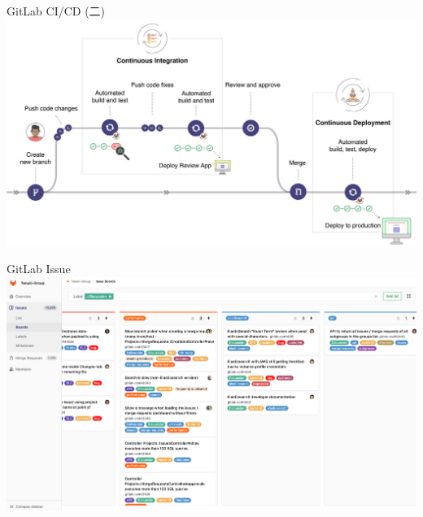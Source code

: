 \begin{frame}{GitLab CI/CD (二)}
    \centering
    \includegraphics[scale=0.16]{figures/gitlab-cicd.jpg}
\end{frame}

\begin{frame}{GitLab Issue}
    \centering
    \includegraphics[scale=0.1]{figures/gitlab-issue-dashboard.png}
\end{frame}